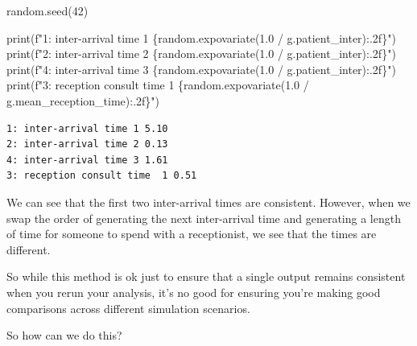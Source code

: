 \documentclass[
  letterpaper,
  DIV=11,
  numbers=noendperiod]{scrreprt}
\newenvironment{Shaded}{\begin{snugshade}}{\end{snugshade}}
\newcommand{\BuiltInTok}[1]{\textcolor[rgb]{0.00,0.23,0.31}{#1}}
\newcommand{\DecValTok}[1]{\textcolor[rgb]{0.68,0.00,0.00}{#1}}
\newcommand{\FloatTok}[1]{\textcolor[rgb]{0.68,0.00,0.00}{#1}}
\newcommand{\NormalTok}[1]{\textcolor[rgb]{0.00,0.23,0.31}{#1}}
\newcommand{\OperatorTok}[1]{\textcolor[rgb]{0.37,0.37,0.37}{#1}}
\newcommand{\SpecialCharTok}[1]{\textcolor[rgb]{0.37,0.37,0.37}{#1}}
\newcommand{\SpecialStringTok}[1]{\textcolor[rgb]{0.13,0.47,0.30}{#1}}
\begin{document}
\begin{tcolorbox}
\begin{Shaded}
\begin{Highlighting}[]
\NormalTok{random.seed(}\DecValTok{42}\NormalTok{)}

\BuiltInTok{print}\NormalTok{(}\SpecialStringTok{f"1: inter{-}arrival time 1 }\SpecialCharTok{\{}\NormalTok{random}\SpecialCharTok{.}\NormalTok{expovariate(}\FloatTok{1.0} \OperatorTok{/}\NormalTok{ g.patient\_inter)}\SpecialCharTok{:.2f\}}\SpecialStringTok{"}\NormalTok{)}
\BuiltInTok{print}\NormalTok{(}\SpecialStringTok{f"2: inter{-}arrival time 2 }\SpecialCharTok{\{}\NormalTok{random}\SpecialCharTok{.}\NormalTok{expovariate(}\FloatTok{1.0} \OperatorTok{/}\NormalTok{ g.patient\_inter)}\SpecialCharTok{:.2f\}}\SpecialStringTok{"}\NormalTok{)}
\BuiltInTok{print}\NormalTok{(}\SpecialStringTok{f"4: inter{-}arrival time 3 }\SpecialCharTok{\{}\NormalTok{random}\SpecialCharTok{.}\NormalTok{expovariate(}\FloatTok{1.0} \OperatorTok{/}\NormalTok{ g.patient\_inter)}\SpecialCharTok{:.2f\}}\SpecialStringTok{"}\NormalTok{)}
\BuiltInTok{print}\NormalTok{(}\SpecialStringTok{f"3: reception consult time  1 }\SpecialCharTok{\{}\NormalTok{random}\SpecialCharTok{.}\NormalTok{expovariate(}\FloatTok{1.0} \OperatorTok{/}\NormalTok{ g.mean\_reception\_time)}\SpecialCharTok{:.2f\}}\SpecialStringTok{"}\NormalTok{)}
\end{Highlighting}
\end{Shaded}

\begin{verbatim}
1: inter-arrival time 1 5.10
2: inter-arrival time 2 0.13
4: inter-arrival time 3 1.61
3: reception consult time  1 0.51
\end{verbatim}

We can see that the first two inter-arrival times are consistent.
However, when we swap the order of generating the next inter-arrival
time and generating a length of time for someone to spend with a
receptionist, we see that the times are different.

\end{tcolorbox}

\begin{tcolorbox}[enhanced jigsaw, rightrule=.15mm, colback=white, colframe=quarto-callout-warning-color-frame, colbacktitle=quarto-callout-warning-color!10!white, toprule=.15mm, coltitle=black, opacityback=0, titlerule=0mm, bottomtitle=1mm, breakable, title=\textcolor{quarto-callout-warning-color}{\faExclamationTriangle}\hspace{0.5em}{Warning}, opacitybacktitle=0.6, toptitle=1mm, arc=.35mm, bottomrule=.15mm, leftrule=.75mm, left=2mm]

So while this method is ok just to ensure that a single output remains
consistent when you rerun your analysis, it's no good for ensuring
you're making good comparisons across different simulation scenarios.

So how can we do this?

\end{tcolorbox}
\end{document}

